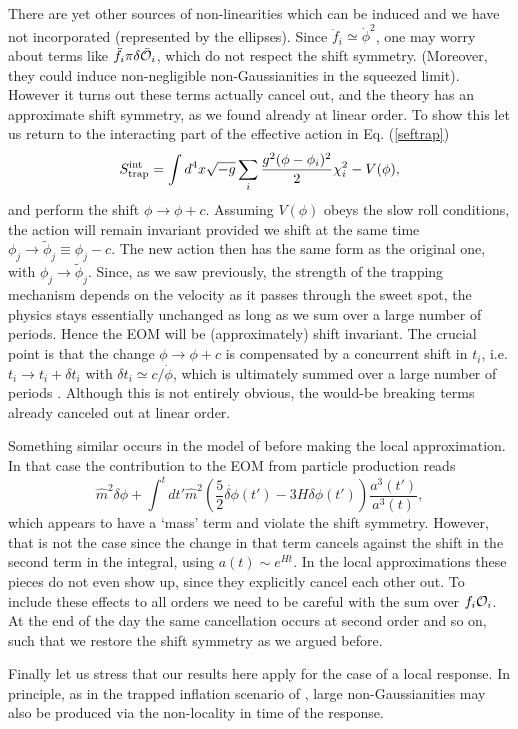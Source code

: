 \documentclass[11pt,amsmath,floats,floatfix,nofootinbib,secnumarabic, superscriptaddress, tightenlines]{revtex4}
\newcommand{\beq}{\begin{equation}}
\newcommand{\eeq}{\end{equation}}
\newcommand{\calo}{{\cal O}}
\begin{document}
{There are yet other sources of non-linearities which can be induced and we have not incorporated (represented by the ellipses). Since $\ddot f_i \simeq \dot\phi^2$, one may worry about terms like  $\ddot f_i \pi \delta\bar\calo_i$, which do not respect the shift symmetry. (Moreover, they could induce non-negligible non-Gaussianities in the squeezed limit). However it turns out these terms actually cancel out, and the theory has an approximate shift symmetry, as we found already at linear order. To show this let us return to the interacting part of the effective action in Eq. (\ref{seftrap})
\beq
S^{\rm int}_{\rm trap}=\int d^4x\sqrt{-g} \sum_i\frac{ g^2(\phi-\phi_i)^2}{2}\chi_i^2 - V(\phi),\eeq
and perform the shift $\phi \to \phi+ c$. Assuming $V(\phi)$ obeys the slow roll conditions, the action will remain invariant provided we shift at the same time $\phi_j \to \tilde\phi_j \equiv \phi_j - c$. The new action then has the same form as the original one, with $\phi_j \to \tilde\phi_j$. Since, as we saw previously, the strength of the trapping mechanism depends on the velocity as it passes through the sweet spot, the physics stays essentially unchanged as long as we sum over a large number of periods. Hence the EOM will be (approximately) shift invariant. The crucial point is that the change $\phi \to \phi+c$ is compensated by a concurrent shift in $t_i$, i.e. $t_i \to t_i +\delta t_i$ with $\delta t_i \simeq c/\dot\phi$, which is ultimately summed over a large number of periods \cite{trapped}. Although this is not entirely obvious, the would-be breaking terms already canceled out at linear order. 

Something similar occurs in the model of \cite{trapped} before making the local approximation. In that case the contribution to the EOM from particle production reads \cite{trapped}
\beq
\hat m^2 \delta\phi + \int^t dt' \hat m^2 \left(\frac{5}{2} \dot{\delta\phi}(t')-3 H \delta\phi(t')\right) \frac{a^3(t')}{a^3(t)},
\eeq
which appears to have a `mass' term and violate the shift symmetry. However, that is not the case since the change in that term cancels against the shift in the second term in the integral, using $a(t) \sim e^{Ht}$. In the local approximations these pieces do not even show up, since they explicitly cancel each other out. To include these effects to all orders we need to be careful with the  sum over $f_i\calo_i$. At the end of the day the same cancellation occurs at second order and so on, such that we restore the shift symmetry as we argued before.

Finally let us stress that our results here apply for the case of a local response. In principle, as in the trapped inflation scenario of \cite{trapped}, large non-Gaussianities may also be produced via the non-locality in time of the response.

}
\end{document}
